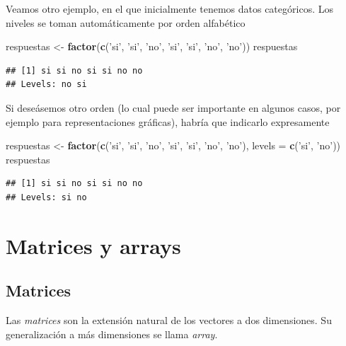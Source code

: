\documentclass[]{book}
\newenvironment{Shaded}{\begin{snugshade}}{\end{snugshade}}
\newcommand{\KeywordTok}[1]{\textcolor[rgb]{0.13,0.29,0.53}{\textbf{#1}}}
\newcommand{\DataTypeTok}[1]{\textcolor[rgb]{0.13,0.29,0.53}{#1}}
\newcommand{\StringTok}[1]{\textcolor[rgb]{0.31,0.60,0.02}{#1}}
\newcommand{\NormalTok}[1]{#1}
\begin{document}
Veamos otro ejemplo, en el que inicialmente tenemos datos categóricos.
Los niveles se toman automáticamente por orden alfabético

\begin{Shaded}
\begin{Highlighting}[]
\NormalTok{respuestas <-}\StringTok{ }\KeywordTok{factor}\NormalTok{(}\KeywordTok{c}\NormalTok{(}\StringTok{'si'}\NormalTok{, }\StringTok{'si'}\NormalTok{, }\StringTok{'no'}\NormalTok{, }\StringTok{'si'}\NormalTok{, }\StringTok{'si'}\NormalTok{, }\StringTok{'no'}\NormalTok{, }\StringTok{'no'}\NormalTok{))}
\NormalTok{respuestas}
\end{Highlighting}
\end{Shaded}

\begin{verbatim}
## [1] si si no si si no no
## Levels: no si
\end{verbatim}

Si deseásemos otro orden (lo cual puede ser importante en algunos casos,
por ejemplo para representaciones gráficas), habría que indicarlo
expresamente

\begin{Shaded}
\begin{Highlighting}[]
\NormalTok{respuestas <-}\StringTok{ }\KeywordTok{factor}\NormalTok{(}\KeywordTok{c}\NormalTok{(}\StringTok{'si'}\NormalTok{, }\StringTok{'si'}\NormalTok{, }\StringTok{'no'}\NormalTok{, }\StringTok{'si'}\NormalTok{, }\StringTok{'si'}\NormalTok{, }\StringTok{'no'}\NormalTok{, }\StringTok{'no'}\NormalTok{), }\DataTypeTok{levels =} \KeywordTok{c}\NormalTok{(}\StringTok{'si'}\NormalTok{, }\StringTok{'no'}\NormalTok{))}
\NormalTok{respuestas}
\end{Highlighting}
\end{Shaded}

\begin{verbatim}
## [1] si si no si si no no
## Levels: si no
\end{verbatim}

\section{Matrices y arrays}\label{matrices-y-arrays}

\subsection{Matrices}\label{matrices}

Las \emph{matrices} son la extensión natural de los vectores a dos
dimensiones. Su generalización a más dimensiones se llama \emph{array}.
\end{document}
